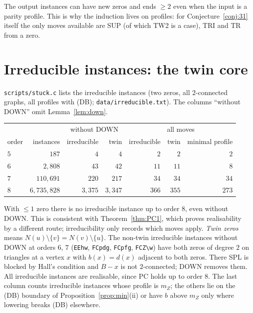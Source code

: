 \documentclass[11pt]{amsart}
\theoremstyle{definition}
\begin{document}
The output instances can have new zeros and ends $\ge2$ even when the input is a parity profile. This is
why the induction lives on profiles: for Conjecture~\ref{conj:31} itself the only moves available are SUP
(of which TW2 is a case), TRI and TR from a zero.

\section{Irreducible instances: the twin core}\label{sec:core}

\texttt{scripts/stuck.c} lists the irreducible instances (two zeros, all $2$-connected graphs, all
profiles with (DB); \texttt{data/irreducible.txt}). The columns ``without DOWN'' omit
Lemma~\ref{lem:down}.
\begin{center}\footnotesize
\begin{tabular}{@{}lrrrrrr@{}}
\toprule
 & & \multicolumn{2}{c}{without DOWN} & \multicolumn{3}{c}{all moves}\\
order & instances & irreducible & twin & irreducible & twin & minimal profile\\
\midrule
$5$ & $187$ & $4$ & $4$ & $2$ & $2$ & $2$\\
$6$ & $2{,}808$ & $43$ & $42$ & $11$ & $11$ & $8$\\
$7$ & $110{,}691$ & $220$ & $217$ & $34$ & $34$ & $34$\\
$8$ & $6{,}735{,}828$ & $3{,}375$ & $3{,}347$ & $366$ & $355$ & $273$\\
\bottomrule
\end{tabular}
\end{center}
With $\le1$ zero there is no irreducible instance up to order $8$, even without DOWN. This is consistent with
Theorem~\ref{thm:PC1}, which proves realisability by a different route; irreducibility only records which
moves apply. \emph{Twin zeros} means
$N(u)\setminus\{v\}=N(v)\setminus\{u\}$. The non-twin irreducible instances without DOWN at orders $6$, $7$
(\texttt{EEhw}, \texttt{FCpdg}, \texttt{FCpfg}, \texttt{FCZ\textbackslash w}) have both zeros of degree $2$
on triangles at a vertex $x$ with $b(x)=d(x)$ adjacent to both zeros. There SPL is blocked by Hall's
condition and $B-x$ is not $2$-connected; DOWN removes them. All irreducible instances are realisable,
since PC holds up to order $8$. The last column counts irreducible instances whose profile is $m_Z$; the
others lie on the (DB) boundary of Proposition~\ref{prop:min}(ii) or have $b$ above $m_Z$ only where
lowering breaks (DB) elsewhere.
\end{document}
